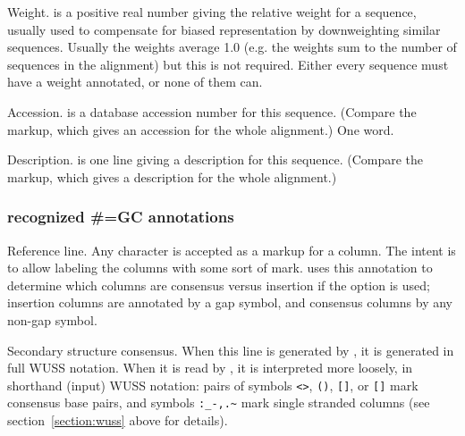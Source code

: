 \begin{sreitems}{}
\item [\emprog{WT  <f>}]
        Weight.  is a positive real number giving the
        relative weight for a sequence, usually used to compensate
        for biased representation by downweighting similar sequences.   
        Usually the weights average 1.0 (e.g. the weights sum to
        the number of sequences in the alignment) but this is not
        required. Either every sequence must have a weight annotated, 
        or none of them can.  

\item [\emprog{AC  <s>}]
        Accession.  is a database accession number for 
        this sequence. (Compare the  markup, which gives
        an accession for the whole alignment.) One word. 
        
\item [\emprog{DE  <s>}]
        Description.  is one line giving a description for
        this sequence. (Compare the  markup, which gives
        a description for the whole alignment.)
\end{sreitems}


\subsubsection{recognized \#=GC annotations}

\begin{sreitems}{}
\item [\emprog{RF}]
        Reference line. Any character is accepted as a markup for a
        column. The intent is to allow labeling the columns with some
        sort of mark.  uses this annotation to determine
        which columns are consensus versus insertion if the
         option is used; insertion columns are annotated
        by a gap symbol, and consensus columns by any non-gap symbol.
        
\item [\emprog{SS\_cons}]
	Secondary structure consensus.  When this line is generated by
        , it is generated in full WUSS notation.
        When it is read by , it is interpreted more
        loosely, in shorthand (input) WUSS notation: pairs of symbols
        \verb+<>+, \verb+()+, \verb+[]+, or \verb+[]+ mark consensus
        base pairs, and symbols \verb+:_-,.~+ mark single stranded
        columns (see section~\ref{section:wuss} above for details).

\end{sreitems}

